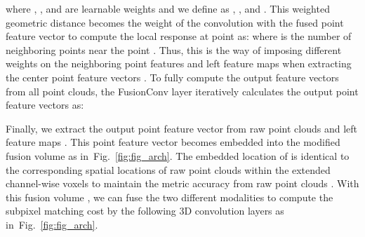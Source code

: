 \documentclass[letterpaper, 10 pt, conference]{ieeeconf}
\newcommand{\Fref}[1]{Fig.~\textcolor{blue}{\ref{#1}}}
\begin{document}
where , ,  and  are learnable weights and we define   as , , and .
This weighted geometric distance  becomes the weight of the convolution with the fused point feature vector  to compute the local response at point  as: 
where  is the number of neighboring points near the point . Thus, this is the way of imposing different weights  on the neighboring point features  and left feature maps  when extracting the center point feature vectors . To fully compute the output feature vectors from all point clouds, the FusionConv layer iteratively calculates the output point feature vectors  as:


Finally, we extract the output point feature vector  from raw point clouds  and left feature maps . This point feature vector becomes embedded into the modified fusion volume  as in~\Fref{fig:fig_arch}. The embedded location of  is identical to the corresponding spatial locations of raw point clouds  within the extended channel-wise voxels  to maintain the metric accuracy from raw point clouds . With this fusion volume , we can fuse the two different modalities to compute the subpixel matching cost by the following 3D convolution layers as in~\Fref{fig:fig_arch}.
\end{document}
